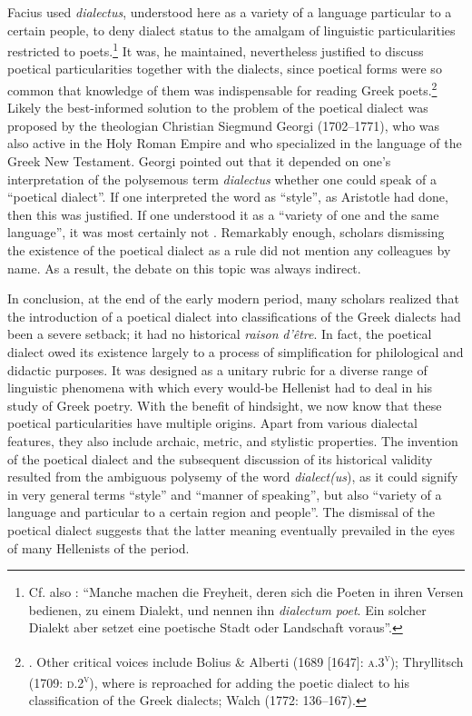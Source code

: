 Facius used \textit{dialectus}, understood here as a variety of a language particular to a certain people, to deny dialect status to the amalgam of linguistic particularities restricted to poets.\footnote{Cf. also \citet[67]{Haas1780}: “Manche machen die Freyheit, deren sich die Poeten in ihren Versen bedienen, zu einem Dialekt, und nennen ihn \textit{dialectum} \textit{poet}. Ein solcher Dialekt aber setzet eine poetische Stadt oder Landschaft voraus”.} It was, he maintained, nevertheless justified to discuss poetical particularities together with the dialects, since poetical forms were so common that knowledge of them was indispensable for reading Greek poets.\footnote{\citet[98]{Facius1782}. Other critical voices include Bolius \& Alberti (1689 [1647]: \textsc{a.3}\textsc{\textsuperscript{v}}); Thryllitsch (1709: \textsc{d.2}\textsc{\textsuperscript{v}}), where \citet[147]{Reyher1634} is reproached for adding the poetic dialect to his classification of the Greek dialects; Walch (1772: 136–167).} Likely the best-informed solution to the problem of the poetical dialect was proposed by the theologian Christian Siegmund Georgi (1702–1771), who was also active in the Holy Roman Empire and who specialized in the language of the Greek New Testament. Georgi pointed out that it depended on one’s interpretation of the polysemous term \textit{dialectus} whether one could speak of a “poetical dialect”. If one interpreted the word as “style”, as Aristotle had done, then this was justified. If one understood it as a “variety of one and the same language”, it was most certainly not \citep[169]{Georgi1733}. Remarkably enough, scholars dismissing the existence of the poetical dialect as a rule did not mention any colleagues by name. As a result, the debate on this topic was always indirect.

In conclusion, at the end of the early modern period, many scholars realized that the introduction of a poetical dialect into classifications of the Greek dialects had been a severe setback; it had no historical \textit{raison} \textit{d’être}. In fact, the poetical dialect owed its existence largely to a process of simplification for philological and didactic purposes. It was designed as a unitary rubric for a diverse range of linguistic phenomena with which every would-be Hellenist had to deal in his study of Greek poetry. With the benefit of hindsight, we now know that these poetical particularities have multiple origins. Apart from various dialectal features, they also include archaic, metric, and stylistic properties. The invention of the poetical dialect and the subsequent discussion of its historical validity resulted from the ambiguous polysemy of the word \textit{dialect(us}), as it could signify in very general terms “style” and “manner of speaking”, but also “variety of a language and particular to a certain region and people”. The dismissal of the poetical dialect suggests that the latter meaning eventually prevailed in the eyes of many Hellenists of the period.

